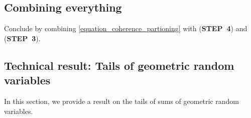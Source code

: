 \documentclass[preprint,cleveref,12pt]{colt2025}
\def\STEP#1{(\strong{STEP~#1})}
\newcommand{\strong}[1]{\textbf{#1}}
\begin{document}
    \subsection{Combining everything}
    \label{appendix_coherence_combining}

    Conclude by combining \eqref{equation_coherence_partioning} with  \STEP{4} and  \STEP{3}.

    \subsection{Technical result: Tails of geometric random variables}

    In this section, we provide a result on the tails of sums of geometric random variables. 
\end{document}
